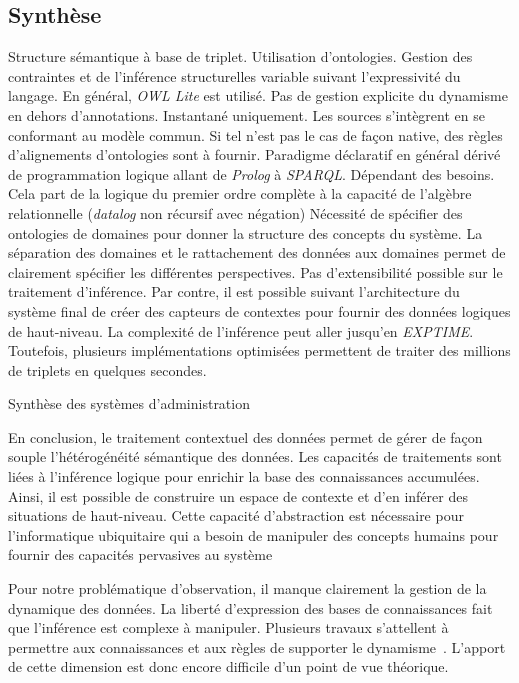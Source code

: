 \subsection{Synthèse}
\begin{table}[!ht]
\criteretabDonnee
    {Structure sémantique à base de triplet.}
    {Utilisation d'ontologies. Gestion des contraintes et de l'inférence structurelles variable suivant l'expressivité du langage. En général, \textit{OWL Lite} est utilisé.}
    {Pas de gestion explicite du dynamisme en dehors d'annotations.}
\criteretabTraitement
    {Instantané uniquement.}
    {Les sources s'intègrent en se conformant au modèle commun. Si tel n'est pas le cas de façon native, des règles d'alignements d'ontologies sont à fournir.}
    {Paradigme déclaratif en général dérivé de programmation logique allant de \textit{Prolog} à \textit{SPARQL}.}
    {Dépendant des besoins. Cela part de la logique du premier ordre complète à la capacité de l'algèbre relationnelle (\textit{datalog} non récursif avec négation)}
\criteretabAdaptabilite
    {Nécessité de spécifier des ontologies de domaines pour donner la structure des concepts du système.}
    {La séparation des domaines et le rattachement des données aux domaines permet de clairement spécifier les différentes perspectives.}
    {Pas d'extensibilité possible sur le traitement d'inférence. Par contre, il est possible suivant l'architecture du système final de créer des capteurs de contextes pour fournir des données logiques de haut-niveau.}
    {La complexité de l'inférence peut aller jusqu'en \textit{EXPTIME}. Toutefois, plusieurs implémentations optimisées permettent de traiter des millions de triplets en quelques secondes.}
\caption{Synthèse des systèmes d'administration}\label{tab:rw:supervision:contexte:synthese}
\end{table}
En conclusion, le traitement contextuel des données permet de gérer de façon souple l'hétérogénéité sémantique des données. Les capacités de traitements sont liées à l'inférence logique pour enrichir la base des connaissances accumulées. Ainsi, il est possible de construire un espace de contexte et d'en inférer des situations de haut-niveau. Cette capacité d'abstraction est nécessaire pour l'informatique ubiquitaire qui a besoin de manipuler des concepts humains pour fournir des capacités pervasives au système

Pour notre problématique d'observation, il manque clairement la gestion de la dynamique des données. La liberté d'expression des bases de connaissances fait que l'inférence est complexe à manipuler. Plusieurs travaux s’attellent à permettre aux connaissances et aux règles de supporter le dynamisme~\cite{Weikum:webknowledge, Hellerstein:declarative}. L'apport de cette dimension est donc encore difficile d'un point de vue théorique.